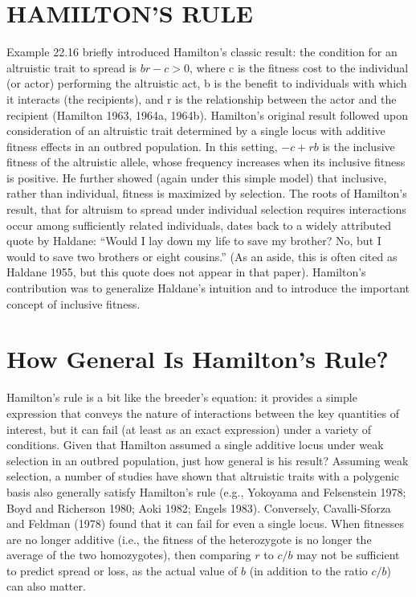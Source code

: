 \documentclass{article}
\begin{document}
\section{HAMILTON'S RULE}
Example 22.16 briefly introduced Hamilton’s classic result: the condition for an altruistic trait to spread is  $ br - c > 0 $, where c is the fitness cost to the individual (or actor) performing the altruistic act, b is the benefit to individuals with which it interacts (the recipients), and r is the relationship between the actor and the recipient (Hamilton 1963, 1964a, 1964b). Hamilton’s original result followed upon consideration of an altruistic trait determined by a single locus with additive fitness effects in an outbred population. In this setting,  $ -c + r b $ is the inclusive fitness of the altruistic allele, whose frequency increases when its inclusive fitness is positive. He further showed (again under this simple model) that inclusive, rather than individual, fitness is maximized by selection. The roots of Hamilton’s result, that for altruism to spread under individual selection requires interactions occur among sufficiently related individuals, dates back to a widely attributed quote by Haldane: “Would I lay down my life to save my brother? No, but I would to save two brothers or eight cousins.” (As an aside, this is often cited as Haldane 1955, but this quote does not appear in that paper). Hamilton’s contribution was to generalize Haldane’s intuition and to introduce the important concept of inclusive fitness.

\section{How General Is Hamilton's Rule?}
Hamilton’s rule is a bit like the breeder’s equation: it provides a simple expression that conveys the nature of interactions between the key quantities of interest, but it can fail (at least as an exact expression) under a variety of conditions. Given that Hamilton assumed a single additive locus under weak selection in an outbred population, just how general is his result? Assuming weak selection, a number of studies have shown that altruistic traits with a polygenic basis also generally satisfy Hamilton’s rule (e.g., Yokoyama and Felsenstein 1978; Boyd and Richerson 1980; Aoki 1982; Engels 1983). Conversely, Cavalli-Sforza and Feldman (1978) found that it can fail for even a single locus. When fitnesses are no longer additive (i.e., the fitness of the heterozygote is no longer the average of the two homozygotes), then comparing  $ r $ to  $ c/b $ may not be sufficient to predict spread or loss, as the actual value of  $ b $ (in addition to the ratio  $ c/b $) can also matter.
\end{document}

